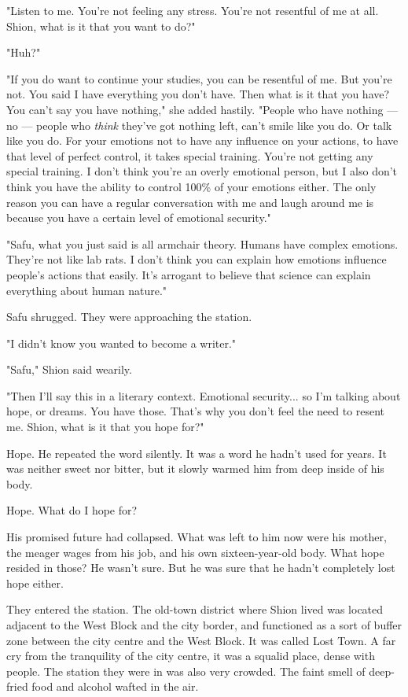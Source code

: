 "Listen to me. You're not feeling any stress. You're not resentful of me
at all. Shion, what is it that you want to do?"

"Huh?"

"If you do want to continue your studies, you can be resentful of me.
But you're not. You said I have everything you don't have. Then what is
it that you have? You can't say you have nothing," she added hastily.
"People who have nothing --- no --- people who \emph{think} they've got nothing
left, can't smile like you do. Or talk like you do. For your emotions
not to have any influence on your actions, to have that level of perfect
control, it takes special training. You're not getting any special
training. I don't think you're an overly emotional person, but I also
don't think you have the ability to control 100\% of your emotions
either. The only reason you can have a regular conversation with me and
laugh around me is because you have a certain level of emotional
security."

"Safu, what you just said is all armchair theory. Humans have complex
emotions. They're not like lab rats. I don't think you can explain how
emotions influence people's actions that easily. It's arrogant to
believe that science can explain everything about human nature."

Safu shrugged. They were approaching the station.

"I didn't know you wanted to become a writer."

"Safu," Shion said wearily.

"Then I'll say this in a literary context. Emotional security... so I'm
talking about hope, or dreams. You have those. That's why you don't feel
the need to resent me. Shion, what is it that you hope for?"

\mybreak

Hope. He repeated the word silently. It was a word he hadn't used for
years. It was neither sweet nor bitter, but it slowly warmed him from
deep inside of his body.

Hope. What do I hope for?

\myspace

His promised future had collapsed. What was left to him now were his
mother, the meager wages from his job, and his own sixteen-year-old
body. What hope resided in those? He wasn't sure. But he was sure that
he hadn't completely lost hope either.

They entered the station. The old-town district where Shion lived was
located adjacent to the West Block and the city border, and functioned
as a sort of buffer zone between the city centre and the West Block. It
was called Lost Town. A far cry from the tranquility of the city centre,
it was a squalid place, dense with people. The station they were in was
also very crowded. The faint smell of deep-fried food and alcohol wafted
in the air.

